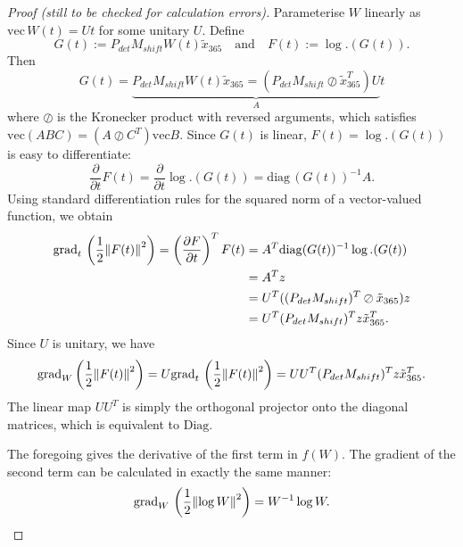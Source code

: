 \documentclass{article}
\begin{document}
\begin{proof}[Proof (still to be checked for calculation errors)]

Parameterise $W$ linearly as $\mathrm{vec}\, W(t) = U t$ for some unitary $U$.
Define $$
G(t) := 
P_{det} M_{shift} W(t) \tilde{x}_{365}
\quad\text{and}\quad
F(t) := \log.(G(t))
.$$
Then 
$$
G(t) = \underbrace{P_{det} M_{shift} W(t) \tilde{x}_{365} = (P_{det}M_{shift} \oslash \tilde{x}_{365}^T) U}_A t
$$
where $\oslash$ is the Kronecker product with reversed arguments, which satisfies $\mathrm{vec}(A B C) = (A \oslash C^T) \mathrm{vec} B$.
Since $G(t)$ is linear, $F(t) = \log.(G(t))$ is easy to differentiate:
$$
\frac{\partial}{\partial t} F(t) =
\frac{\partial}{\partial t} \log.(G(t)) = \mathrm{diag}\,(G(t))^{-1} A
.$$
Using standard differentiation rules for the squared norm of a vector-valued function, we obtain
\begin{align*}
\mathrm{grad}_t\, \left(\frac{1}{2} \norm{F(t)}^2 \right) = \left(\frac{\partial F}{\partial t}\right)^T F(t)
&= A^T \mathrm{diag}(G(t))^{-1} \log.(G(t)) \\
&= A^T z \\
&= U^T ((P_{det} M_{shift})^T \oslash \tilde{x}_{365}) z \\
&= U^T (P_{det} M_{shift})^T z \tilde{x}_{365}^T
.
\end{align*}
Since $U$ is unitary, we have $$
\mathrm{grad}_W \left(\frac{1}{2} \norm{F(t)}^2 \right)
=
U \mathrm{grad}_t\, \left(\frac{1}{2} \norm{F(t)}^2 \right)
=
UU^T (P_{det} M_{shift})^T z \tilde{x}_{365}^T
.$$
The linear map $UU^T$ is simply the orthogonal projector onto the diagonal matrices, which is equivalent to $\mathrm{Diag}$.

The foregoing gives the derivative of the first term in $f(W)$. The gradient of the second term can be calculated in exactly the same manner: 
$$
\mathrm{grad}_W\, \left(\frac{1}{2}\norm{\log W}^2\right) = W^{-1} \log W
.$$
\end{proof}


\printbibliography
\end{document}
